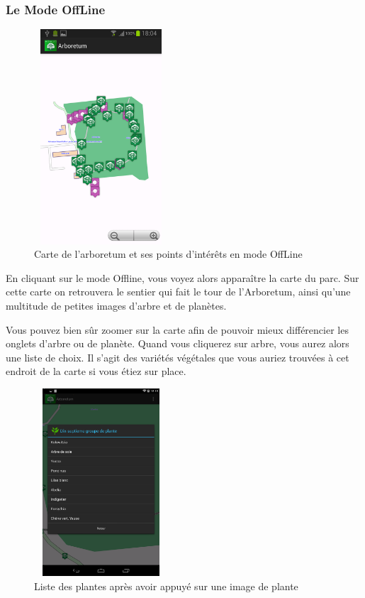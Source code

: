 \documentclass[a4paper,11pt]{article}
\begin{document}
   \subsubsection{Le Mode OffLine}
     \begin{figure}[H]
     \begin{center}
      \includegraphics[width=5cm,height=8cm]{modeOffLine.png}
    \caption{Carte de l'arboretum et ses points d'intérêts en mode OffLine}
     \end{center}
    \end{figure}
    
    En cliquant sur le mode Offline, vous voyez alors apparaître la carte du parc. Sur cette carte on retrouvera le sentier qui fait 
    le tour de l'Arboretum, ainsi qu'une multitude de petites images d'arbre et de planètes. 
    
    Vous pouvez bien sûr zoomer sur la carte afin de pouvoir mieux différencier les onglets d'arbre ou de planète.
    Quand vous cliquerez sur arbre, vous aurez alors une liste de choix. Il s'agit des variétés végétales que vous auriez trouvées à cet endroit de la carte si vous étiez sur place.
    
     \begin{figure}[H]
     \begin{center}
      \includegraphics[width=5cm,height=7cm]{choix.png}
    \caption{Liste des plantes après avoir appuyé sur une image de plante}
     \end{center}
    \end{figure}
    
\end{document}
